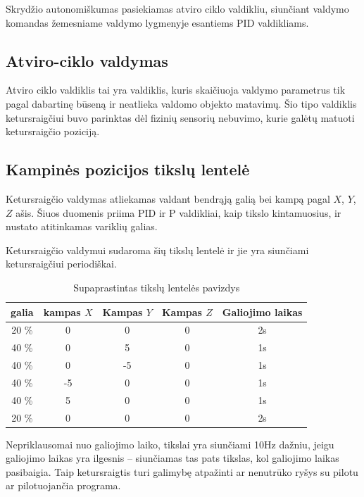 \documentclass[12pt, a4paper, lithuanian, final]{article}
\begin{document}
Skrydžio autonomiškumas pasiekiamas atviro ciklo valdikliu, siunčiant valdymo komandas žemesniame valdymo lygmenyje esantiems PID valdikliams.

\subsection{Atviro-ciklo valdymas}

Atviro ciklo valdiklis tai yra valdiklis, kuris skaičiuoja valdymo parametrus tik pagal dabartinę būseną ir neatlieka valdomo objekto matavimų.
Šio tipo valdiklis ketursraigčiui buvo parinktas dėl fizinių sensorių nebuvimo, kurie galėtų matuoti ketursraigčio poziciją.

\subsection{Kampinės pozicijos tikslų lentelė}

Ketursraigčio valdymas atliekamas valdant bendrąją galią bei kampą pagal $X$, $Y$, $Z$ ašis.
Šiuos duomenis priima PID ir P valdikliai, kaip tikslo kintamuosius, ir nustato atitinkamas variklių galias.

Ketursraigčio valdymui sudaroma šių tikslų lentelė ir jie yra siunčiami ketursraigčiui periodiškai.

\begin{center}
\begin{table}[h]
\begin{tabular}{ | c | c | c | c | c | }
	\hline
	\textbf{galia} & \textbf{kampas $X$} & \textbf{Kampas $Y$} & \textbf{Kampas $Z$} & \textbf{Galiojimo laikas} \\
	\hline
	20 \% & 0\degree & 0\degree & 0\degree & 2s \\
	\hline
	40 \% & 0\degree & 5\degree & 0\degree & 1s \\
	\hline
	40 \% & 0\degree & -5\degree & 0\degree & 1s \\
	\hline
	40 \% & -5\degree & 0\degree & 0\degree & 1s \\
	\hline
	40 \% & 5\degree & 0\degree & 0\degree & 1s \\
	\hline
	20 \% & 0\degree & 0\degree & 0\degree & 2s \\
	\hline
\end{tabular}
\caption{Supaprastintas tikslų lentelės pavizdys}
\end{table}
\end{center}

Nepriklausomai nuo galiojimo laiko, tikslai yra siunčiami 10Hz dažniu, jeigu galiojimo laikas yra ilgesnis -- siunčiamas tas pats tikslas, kol galiojimo laikas pasibaigia.
Taip ketursraigtis turi galimybę atpažinti ar nenutrūko ryšys su pilotu ar pilotuojančia programa.
\end{document}
